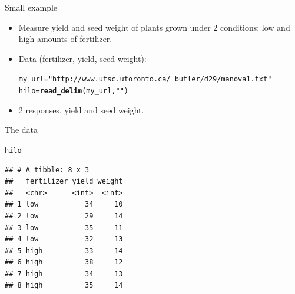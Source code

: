 \documentclass[unknownkeysallowed]{beamer}\usepackage[]{graphicx}\usepackage[]{color}
\makeatletter
\newcommand{\hlstr}[1]{\textcolor[rgb]{0.192,0.494,0.8}{#1}}%
\newcommand{\hlstd}[1]{\textcolor[rgb]{0.345,0.345,0.345}{#1}}%
\newcommand{\hlkwb}[1]{\textcolor[rgb]{0.69,0.353,0.396}{#1}}%
\newcommand{\hlkwd}[1]{\textcolor[rgb]{0.737,0.353,0.396}{\textbf{#1}}}%
\newenvironment{kframe}{%
 \def\at@end@of@kframe{}%
 \ifinner\ifhmode%
  \def\at@end@of@kframe{\end{minipage}}%
  \begin{minipage}{\columnwidth}%
 \fi\fi%
 \def\FrameCommand##1{\hskip\@totalleftmargin \hskip-\fboxsep
 \colorbox{shadecolor}{##1}\hskip-\fboxsep
     \hskip-\linewidth \hskip-\@totalleftmargin \hskip\columnwidth}%
 \MakeFramed {\advance\hsize-\width
   \@totalleftmargin\z@ \linewidth\hsize
   \@setminipage}}%
 {\par\unskip\endMakeFramed%
 \at@end@of@kframe}
\newenvironment{knitrout}{}{} %
\makeatother
\begin{document}
\begin{frame}[fragile]{Small example}

  \begin{itemize}
  \item Measure yield and seed weight of plants grown under 2 conditions: low and high amounts of fertilizer.
  \item Data (fertilizer, yield, seed weight):

 
\begin{knitrout}
\color{fgcolor}\begin{kframe}
\begin{alltt}
\hlstd{my_url}\hlkwb{=}\hlstr{"http://www.utsc.utoronto.ca/~butler/d29/manova1.txt"}
\hlstd{hilo}\hlkwb{=}\hlkwd{read_delim}\hlstd{(my_url,}\hlstr{" "}\hlstd{)}
\end{alltt}


{\ttfamily\noindent\itshape\color{messagecolor}{\#\# Parsed with column specification:\\\#\# cols(\\\#\#\ \  fertilizer = col\_character(),\\\#\#\ \  yield = col\_integer(),\\\#\#\ \  weight = col\_integer()\\\#\# )}}\end{kframe}
\end{knitrout}

  \item 2 responses, yield and seed weight.
  \end{itemize}
  
\end{frame}

\begin{frame}[fragile]{The data}
  
\begin{knitrout}
\color{fgcolor}\begin{kframe}
\begin{alltt}
\hlstd{hilo}
\end{alltt}
\begin{verbatim}
## # A tibble: 8 x 3
##   fertilizer yield weight
##   <chr>      <int>  <int>
## 1 low           34     10
## 2 low           29     14
## 3 low           35     11
## 4 low           32     13
## 5 high          33     14
## 6 high          38     12
## 7 high          34     13
## 8 high          35     14
\end{verbatim}
\end{kframe}
\end{knitrout}
  
\end{frame}
\end{document}

